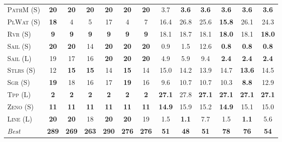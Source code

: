 \documentclass[11pt,landscape]{article}
\begin{document}
\begin{table}[tb]
{\begin{tabular}{|l||cccccc||cccccc||}
\textsc{PathM} (S)&\textbf{20}&\textbf{20}&\textbf{20}&\textbf{20}&\textbf{20}&\textbf{20}&3.7&\textbf{3.6}&\textbf{3.6}&\textbf{3.6}&\textbf{3.6}&\textbf{3.6}\\
\textsc{PlWat} (S)&\textbf{18}&4&5&17&4&7&16.4&26.8&25.6&\textbf{15.8}&26.1&24.3\\
\textsc{Rvr} (S)&\textbf{9}&\textbf{9}&\textbf{9}&\textbf{9}&\textbf{9}&\textbf{9}&18.1&18.7&18.1&\textbf{18.0}&18.1&\textbf{18.0}\\
\textsc{Sail} (S)&\textbf{20}&\textbf{20}&14&\textbf{20}&\textbf{20}&\textbf{20}&0.9&1.5&12.6&\textbf{0.8}&\textbf{0.8}&\textbf{0.8}\\
\textsc{Sail} (L)&19&17&16&\textbf{20}&\textbf{20}&\textbf{20}&4.9&5.9&9.4&\textbf{2.4}&\textbf{2.4}&\textbf{2.4}\\
\textsc{Stlrs} (S)&12&\textbf{15}&\textbf{15}&14&\textbf{15}&14&15.0&14.2&13.9&14.7&\textbf{13.6}&14.5\\
\textsc{Sgr} (S)&\textbf{19}&18&16&17&\textbf{19}&16&9.6&10.7&10.7&10.3&\textbf{8.8}&12.9\\
\textsc{Tpp} (L)&\textbf{2}&\textbf{2}&\textbf{2}&\textbf{2}&\textbf{2}&\textbf{2}&\textbf{27.1}&27.8&\textbf{27.1}&\textbf{27.1}&\textbf{27.1}&\textbf{27.1}\\
\textsc{Zeno} (S)&\textbf{11}&\textbf{11}&\textbf{11}&\textbf{11}&\textbf{11}&\textbf{11}&\textbf{14.9}&15.9&15.2&\textbf{14.9}&15.1&15.0\\
\textsc{Line} (L)&\textbf{20}&\textbf{20}&18&\textbf{20}&\textbf{20}&19&1.5&\textbf{1.1}&7.7&1.5&\textbf{1.1}&5.6
\\\hline
\textit{Best}&\textbf{289}&\textbf{269}&\textbf{263}&\textbf{290}&\textbf{276}&\textbf{276}&\textbf{51}&\textbf{48}&\textbf{51}&\textbf{78}&\textbf{76}&\textbf{54}\\\hline

        \end{tabular}}
        \caption{}
        \label{tab:table-3}
        \end{table}
        
\end{document}
